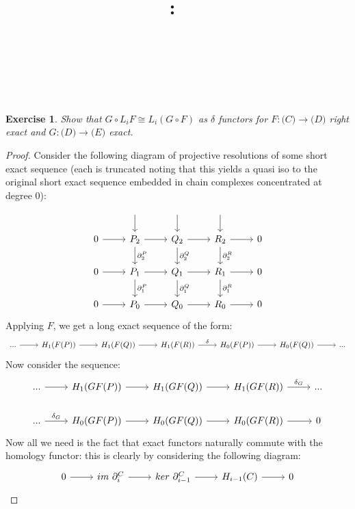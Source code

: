 \documentclass{article}
\title{
    \vspace{2in}
    \textmd{\textbf{\hmwkClass:\ \hmwkTitle}}\\
    \vspace{0.1in}
    \textmd{\hmwkDueDate} \\
    \vspace{0.2in}\large{\textit{\hmwkClassInstructor\  }}
    \vspace{2in}
}
\author{\hmwkAuthorName}
\date{}
\newtheorem{exercise}{Exercise}
\begin{document}
\maketitle
\newpage

\begin{exercise}
  Show that $G \circ L_{i}F \cong L_{i}(G \circ F)$ as $\delta$ functors for $F: \mathcal(C) \to \mathcal(D)$ right exact and $G: \mathcal(D) \to \mathcal(E)$ exact.
\end{exercise}
\begin{proof}
  Consider the following diagram of projective resolutions of some short exact sequence (each is truncated noting that this yields a quasi iso to the original short exact sequence embedded in chain complexes concentrated at degree 0):
  \[
    \begin{tikzcd}
            &  \arrow[d]                              &  \arrow[d]                              &  \arrow[d]                              &   \\
0 \arrow[r] & P_2 \arrow[d, "\partial_2^P"] \arrow[r] & Q_2 \arrow[d, "\partial_2^Q"] \arrow[r] & R_2 \arrow[d, "\partial_2^R"] \arrow[r] & 0 \\
0 \arrow[r] & P_1 \arrow[d, "\partial_1^P"] \arrow[r] & Q_1 \arrow[d, "\partial_1^Q"] \arrow[r] & R_1 \arrow[d, "\partial_1^R"] \arrow[r] & 0 \\
0 \arrow[r] & P_0 \arrow[r]                           & Q_0 \arrow[r]                           & R_0 \arrow[r]                           & 0
\end{tikzcd}
\]
Applying $F$, we get a long exact sequence of the form:
\[
  \begin{tikzcd}
... \arrow[r] & H_1(F(P)) \arrow[r] & H_1(F(Q)) \arrow[r] & H_1(F(R)) \arrow[r, "\delta"] & H_0(F(P)) \arrow[r] & H_0(F(Q)) \arrow[r] & ...
\end{tikzcd}
\]
Now consider the sequence:
\[
  \begin{tikzcd}
    ... \arrow[r] & H_1(GF(P)) \arrow[r] & H_1(GF(Q)) \arrow[r] & H_1(GF(R)) \arrow[r, "\delta_{G}"] & ... \\
   ... \arrow[r, "\delta_{G}"] & H_0(GF(P)) \arrow[r] & H_0(GF(Q)) \arrow[r] & H_0(GF(R)) \arrow[r] & 0
\end{tikzcd}
\]
Now all we need is the fact that exact functors naturally commute with the homology functor: this is clearly by considering the following diagram:
\[
  \begin{tikzcd}
0 \arrow[r] & im \ \partial_i^C \arrow[r] & ker \ \partial_{i-1}^C \arrow[r] & H_{i-1}(C) \arrow[r] & 0

\end{tikzcd}\]
\end{proof}
\end{document}
